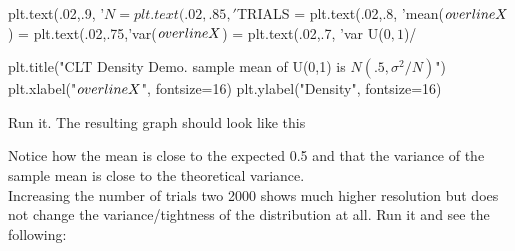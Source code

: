 \begin{fullwidth}
{\small
\begin{pyverbatim}
plt.text(.02,.9, '$N = %
plt.text(.02,.85,'$TRIALS = %
plt.text(.02,.8, 'mean($\\overline{X}$) = %
plt.text(.02,.75,'var($\\overline{X}$) = %
plt.text(.02,.7, 'var U($0,1$)/%

plt.title("CLT Density Demo. sample mean of U(0,1) is $N(.5, \sigma^2/N)$")
plt.xlabel("$\\overline{X}$", fontsize=16)
plt.ylabel("Density", fontsize=16)
\end{pyverbatim}
}

\step Run it. The resulting graph should look like this \\


Notice how the mean is close to the expected 0.5 and that the variance of the sample mean is close to the theoretical variance.\\

\step Increasing the number of trials two 2000 shows much higher resolution but does not change the variance/tightness of the distribution at all. Run it and see the following:


\end{fullwidth}
